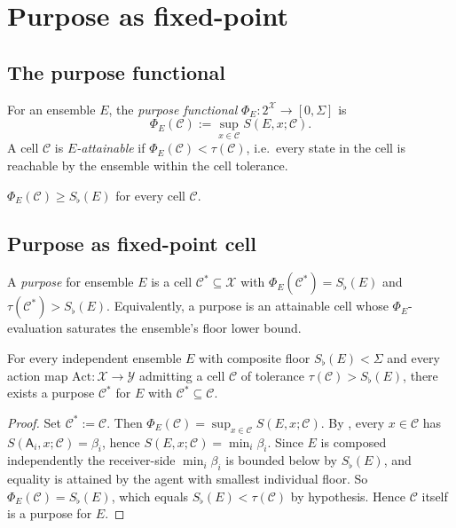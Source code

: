 \documentclass[11pt,twocolumn,a4paper]{article}
\newcommand{\X}{\mathcal{X}}
\newcommand{\Y}{\mathcal{Y}}
\newcommand{\Cell}{\mathcal{C}}
\newcommand{\agent}{\mathsf{A}}
\newcommand{\Sfloor}{S_{\flat}}
\newcommand{\Action}{\mathrm{Act}}
\begin{document}
\section{Purpose as fixed-point}
\label{sec:purpose}

\subsection{The purpose functional}

\begin{definition}\label{def:purp-func}
For an ensemble $E$, the \emph{purpose functional}
$\Phi_E:2^\X\to[0,\Sigma]$ is
\[
\Phi_E(\Cell):=\sup_{x\in\Cell}S(E,x;\Cell).
\]
A cell $\Cell$ is \emph{$E$-attainable} if $\Phi_E(\Cell)<\tau(\Cell)$,
i.e.\ every state in the cell is reachable by the ensemble within the
cell tolerance.
\end{definition}

\begin{proposition}\label{prop:phi-lb}
$\Phi_E(\Cell)\ge\Sfloor(E)$ for every cell $\Cell$.
\end{proposition}

\subsection{Purpose as fixed-point cell}

\begin{definition}[Purpose]\label{def:purpose}
A \emph{purpose} for ensemble $E$ is a cell $\Cell^*\subseteq\X$ with
$\Phi_E(\Cell^*)=\Sfloor(E)$ and $\tau(\Cell^*)>\Sfloor(E)$.
Equivalently, a purpose is an attainable cell whose
$\Phi_E$-evaluation saturates the ensemble's floor lower bound.
\end{definition}

\begin{theorem}\label{thm:purp-exist}
For every independent ensemble $E$ with composite floor $\Sfloor(E)<
\Sigma$ and every action map $\Action:\X\to\Y$ admitting a cell
$\Cell$ of tolerance $\tau(\Cell)>\Sfloor(E)$, there exists a
purpose $\Cell^*$ for $E$ with $\Cell^*\subseteq\Cell$.
\end{theorem}

\begin{proof}
Set $\Cell^*:=\Cell$. Then $\Phi_E(\Cell)=\sup_{x\in\Cell}
S(E,x;\Cell)$. By , every $x\in\Cell$ has
$S(\agent_i,x;\Cell)=\beta_i$, hence
$S(E,x;\Cell)=\min_i\beta_i$. Since $E$ is composed independently
the receiver-side $\min_i\beta_i$ is bounded below by
$\Sfloor(E)$, and equality is attained by the agent
with smallest individual floor. So $\Phi_E(\Cell)=\Sfloor(E)$,
which equals $\Sfloor(E)<\tau(\Cell)$ by hypothesis. Hence $\Cell$
itself is a purpose for $E$.
\end{proof}
\end{document}
